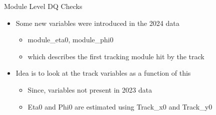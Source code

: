 \begin{frame}{Module Level DQ Checks}
    \begin{itemize}
        \item Some new variables were introduced in the 2024 data
        \begin{itemize}
            \item module\_eta0, module\_phi0
            \item which describes the first tracking module hit by the track
        \end{itemize}
        \item Idea is to look at the track variables as a function of this
        \begin{itemize}
            \item Since, variables not present in 2023 data
            \item Eta0 and Phi0 are estimated using Track\_x0 and Track\_y0
        \end{itemize}
        

    \end{itemize}
\end{frame}

